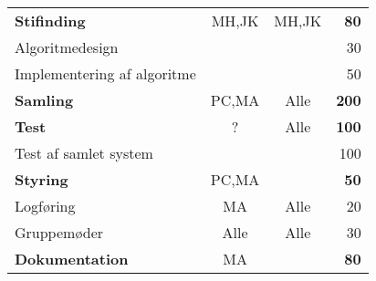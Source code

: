 \begin{center}
\begin{tabular}{l c c r}
	\hspace*{0.3cm} \textbf{Stifinding}							& MH,JK	& MH,JK	& \textbf{80}\\
	\hspace*{0.3cm}\hspace*{0.3cm} Algoritmedesign				&		&		& 30\\
	\hspace*{0.3cm}\hspace*{0.3cm} Implementering af algoritme	&		&		& 50\\
	\hspace*{0.3cm} \textbf{Samling}							& PC,MA	& Alle	& \textbf{200}\\
	\hspace*{0.3cm} \textbf{Test}								& ?		& Alle	& \textbf{100}\\
	\hspace*{0.3cm}\hspace*{0.3cm} Test af samlet system		&		&		& 100\\
	\hline
	\textbf{Styring}											& PC,MA	& 		& \textbf{50}\\
	\hspace*{0.3cm} Logføring									& MA	& Alle	& 20\\
	\hspace*{0.3cm} Gruppemøder									& Alle	& Alle	& 30\\
	\hline
	\textbf{Dokumentation}										& MA	&		& \textbf{80}
\end{tabular}
\end{center}